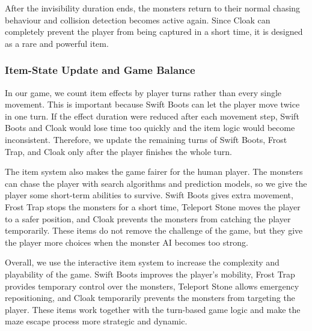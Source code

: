 \documentclass[12pt,a4paper]{article}
\begin{document}
After the invisibility duration ends, the monsters return to their normal chasing behaviour and collision detection becomes active again. Since Cloak can completely prevent the player from being captured in a short time, it is designed as a rare and powerful item.

\subsubsection{Item-State Update and Game Balance}

In our game, we count item effects by player turns rather than every single movement. This is important because Swift Boots can let the player move twice in one turn. If the effect duration were reduced after each movement step, Swift Boots and Cloak would lose time too quickly and the item logic would become inconsistent. Therefore, we update the remaining turns of Swift Boots, Frost Trap, and Cloak only after the player finishes the whole turn.

The item system also makes the game fairer for the human player. The monsters can chase the player with search algorithms and prediction models, so we give the player some short-term abilities to survive. Swift Boots gives extra movement, Frost Trap stops the monsters for a short time, Teleport Stone moves the player to a safer position, and Cloak prevents the monsters from catching the player temporarily. These items do not remove the challenge of the game, but they give the player more choices when the monster AI becomes too strong.

Overall, we use the interactive item system to increase the complexity and playability of the game. Swift Boots improves the player’s mobility, Frost Trap provides temporary control over the monsters, Teleport Stone allows emergency repositioning, and Cloak temporarily prevents the monsters from targeting the player. These items work together with the turn-based game logic and make the maze escape process more strategic and dynamic.
\end{document}

